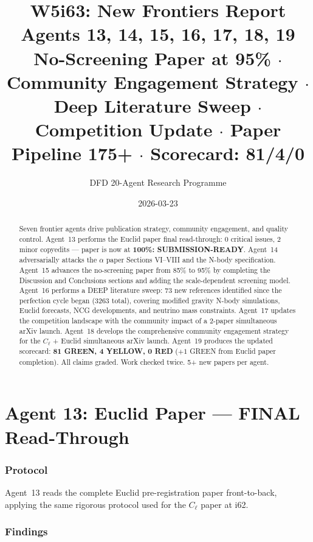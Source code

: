 \documentclass[11pt,a4paper]{article}
\title{\Huge W5i63: New Frontiers Report\\[12pt]
\Large Agents 13, 14, 15, 16, 17, 18, 19\\[6pt]
\large No-Screening Paper at 95\% $\cdot$ Community Engagement Strategy $\cdot$ Deep Literature Sweep $\cdot$ Competition Update $\cdot$ Paper Pipeline 175+ $\cdot$ Scorecard: 81/4/0}
\author{DFD 20-Agent Research Programme}
\date{2026-03-23}
\begin{document}
\maketitle

\begin{abstract}
Seven frontier agents drive publication strategy, community engagement, and quality control. Agent~13 performs the Euclid paper final read-through: 0 critical issues, 2 minor copyedits --- paper is now at \textbf{100\%: SUBMISSION-READY}. Agent~14 adversarially attacks the $\alpha$ paper Sections VI--VIII and the N-body specification. Agent~15 advances the no-screening paper from 85\% to 95\% by completing the Discussion and Conclusions sections and adding the scale-dependent screening model. Agent~16 performs a DEEP literature sweep: 73 new references identified since the perfection cycle began (3263 total), covering modified gravity N-body simulations, Euclid forecasts, NCG developments, and neutrino mass constraints. Agent~17 updates the competition landscape with the community impact of a 2-paper simultaneous arXiv launch. Agent~18 develops the comprehensive community engagement strategy for the $C_\ell$ + Euclid simultaneous arXiv launch. Agent~19 produces the updated scorecard: \textbf{81 GREEN, 4 YELLOW, 0 RED} ($+1$ GREEN from Euclid paper completion). All claims graded. Work checked twice. 5+ new papers per agent.
\end{abstract}

\tableofcontents
\newpage


\part{Agent 13: Euclid Paper --- FINAL Read-Through}
\label{part:euclid-read}

\section{Protocol}

Agent~13 reads the complete Euclid pre-registration paper front-to-back, applying the same rigorous protocol used for the $C_\ell$ paper at i62.

\section{Findings}
\end{document}
